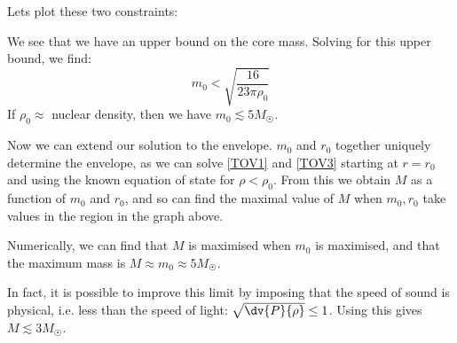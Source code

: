 \documentclass{jknotes}
\begin{document}
Lets plot these two constraints:
\begin{figure}[H]
    \centering
\end{figure}
We see that we have an upper bound on the core mass. Solving for this upper bound, we find:
\begin{equation}
    m_0 < \sqrt{\frac{16}{23\pi\rho_0}}
\end{equation}
If \(\rho_0\approx\) nuclear density, then we have \(m_0 \lesssim 5M_{\astrosun}\).

Now we can extend our solution to the envelope. \(m_0\) and \(r_0\) together uniquely determine the envelope, as we can solve \eqref{TOV1} and \eqref{TOV3} starting at \(r=r_0\) and using the known equation of state for \(\rho<\rho_0\). From this we obtain \(M\) as a function of \(m_0\) and \(r_0\), and so can find the maximal value of \(M\) when \(m_0,r_0\) take values in the region in the graph above.

Numerically, we can find that \(M\) is maximised when \(m_0\) is maximised, and that the maximum mass is \(M\approx m_0\approx5M_{\astrosun}\).

In fact, it is possible to improve this limit by imposing that the speed of sound is physical, i.e. less than the speed of light: \(\sqrt{\dv{P}{\rho}}\le1\). Using this gives \(M \lesssim 3M_{\astrosun}\).
\end{document}

